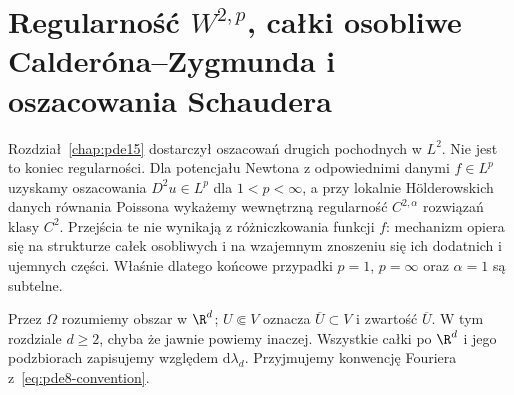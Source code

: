 \chapter[Oszacowania Calderóna--Zygmunda i Schaudera]{Regularność $W^{2,p}$, całki osobliwe Calderóna--Zygmunda i oszacowania Schaudera}
\label{chap:pde16}

Rozdział~\ref{chap:pde15} dostarczył oszacowań drugich pochodnych w $L^2$.
Nie jest to koniec regularności. Dla potencjału Newtona z odpowiednimi danymi $f\in L^p$
uzyskamy oszacowania $D^2u\in L^p$ dla $1<p<\infty$,
a przy lokalnie Hölderowskich danych równania Poissona
wykażemy wewnętrzną regularność $C^{2,\alpha}$ rozwiązań klasy $C^2$.
Przejścia te nie wynikają z różniczkowania funkcji $f$: mechanizm
opiera się na strukturze całek osobliwych i na wzajemnym znoszeniu
się ich dodatnich i ujemnych części. Właśnie dlatego końcowe
przypadki $p=1$, $p=\infty$ oraz $\alpha=1$ są subtelne.

Przez $\Omega$ rozumiemy obszar w $\R^d$; $U\Subset V$ oznacza
$\overline U\subset V$ i zwartość $\overline U$. W tym rozdziale
$d\ge2$, chyba że jawnie powiemy inaczej. Wszystkie całki po
$\R^d$ i jego podzbiorach zapisujemy względem $\mathrm d\lambda_d$.
Przyjmujemy konwencję Fouriera z~\eqref{eq:pde8-convention}.

